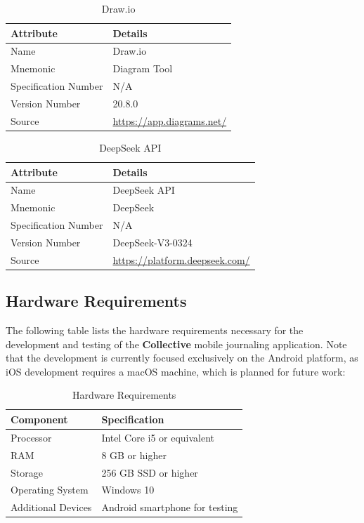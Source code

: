 \begin{table}[H]
\centering
\caption{Draw.io}
\label{tab:drawio-metadata}
\begin{tabular}{|p{4cm}|p{10cm}|}
\hline
\textbf{Attribute} & \textbf{Details} \\
\hline
Name & Draw.io \\
\hline
Mnemonic & Diagram Tool \\
\hline
Specification Number & N/A \\
\hline
Version Number & 20.8.0 \\
\hline
Source & \url{https://app.diagrams.net/} \\
\hline
\end{tabular}
\end{table}

\begin{table}[H]
\centering
\caption{DeepSeek API}
\label{tab:deepseek-metadata}
\begin{tabular}{|p{4cm}|p{10cm}|}
\hline
\textbf{Attribute} & \textbf{Details} \\
\hline
Name & DeepSeek API \\
\hline
Mnemonic & DeepSeek \\
\hline
Specification Number & N/A \\
\hline
Version Number & DeepSeek-V3-0324 \\
\hline
Source & \url{https://platform.deepseek.com/} \\
\hline
\end{tabular}
\end{table}

\subsection{Hardware Requirements}\label{subsec:hardwareRequirements}

The following table lists the hardware requirements necessary for the development and testing of the \textbf{Collective} mobile journaling application. Note that the development is currently focused exclusively on the Android platform, as iOS development requires a macOS machine, which is planned for future work:

\begin{table}[H]
\centering
\caption{Hardware Requirements}
\label{tab:hardware-requirements}
\begin{tabular}{|p{4cm}|p{10cm}|}
\hline
\textbf{Component} & \textbf{Specification} \\
\hline
Processor & Intel Core i5 or equivalent \\
\hline
RAM & 8 GB or higher \\
\hline
Storage & 256 GB SSD or higher \\
\hline
Operating System & Windows 10 \\
\hline
Additional Devices & Android smartphone for testing \\
\hline
\end{tabular}
\end{table}


